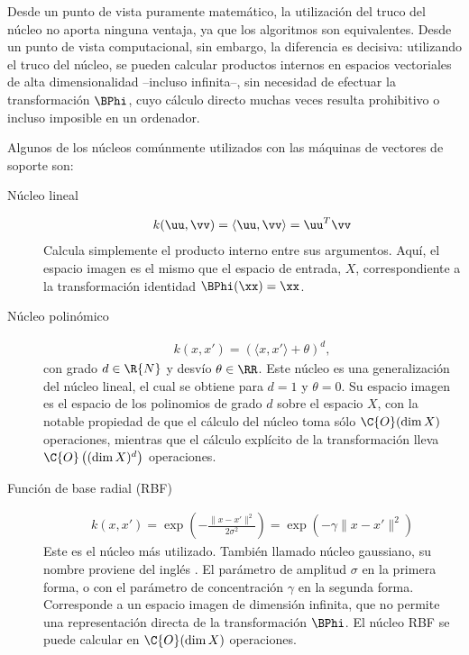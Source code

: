 Desde un punto de vista puramente matemático, la utilización del truco
del núcleo no aporta ninguna ventaja, ya que los algoritmos son
equivalentes. Desde un punto de vista computacional, sin embargo, la
diferencia es decisiva: utilizando el truco del núcleo, se pueden
calcular productos internos en espacios vectoriales de alta
dimensionalidad --incluso infinita--, sin necesidad de efectuar la
transformación $\BPhi$, cuyo cálculo directo muchas veces resulta
prohibitivo o incluso imposible en un ordenador.


Algunos de los núcleos comúnmente utilizados con
las máquinas de vectores de soporte son:
%
\begin{description}
\item[Núcleo lineal]
  \begin{align}
    k(\uu,\vv)=\langle \uu, \vv\rangle=\uu^T\vv
  \end{align}
  Calcula simplemente el producto interno entre sus argumentos. Aquí,
  el espacio imagen es el mismo que el espacio de entrada, $X$,
  correspondiente a la transformación identidad $\BPhi(\xx)=\xx$.
\item[Núcleo polinómico]
  \begin{align}
    k(x,x')=\left(\langle{}x,x'\rangle+\theta\right)^d,
  \end{align}
  con grado $d\in\R{N}$ y desvío $\theta\in\RR$.
  Este núcleo es una generalización del núcleo lineal, el cual se
  obtiene para $d=1$ y $\theta=0$. Su espacio imagen es el espacio de
  los polinomios de grado $d$ sobre el espacio $X$, con la notable
  propiedad de que el cálculo del núcleo toma sólo $\C{O}(\dim{}X)$
  operaciones, mientras que el cálculo explícito de la transformación
  lleva $\C{O}\left((\dim{}X)^d\right)$ operaciones.
\item[Función de base radial (RBF)]
  \begin{align}
    k(x,x')=\exp\left(-\frac{\|x-x'\|^2}{2\sigma^2}\right)
    =\exp\left(-\gamma\|x-x'\|^2\right)
  \end{align}
  Este es el núcleo más utilizado. También llamado núcleo gaussiano,
  su nombre proviene del inglés .  El
  parámetro de amplitud $\sigma$ en la primera forma, o con el
  parámetro de concentración $\gamma$ en la segunda forma. Corresponde
  a un espacio imagen de dimensión infinita, que no permite una
  representación directa de la transformación $\BPhi$.  El núcleo RBF
  se puede calcular en $\C{O}(\dim{}X)$ operaciones.
\end{description}
